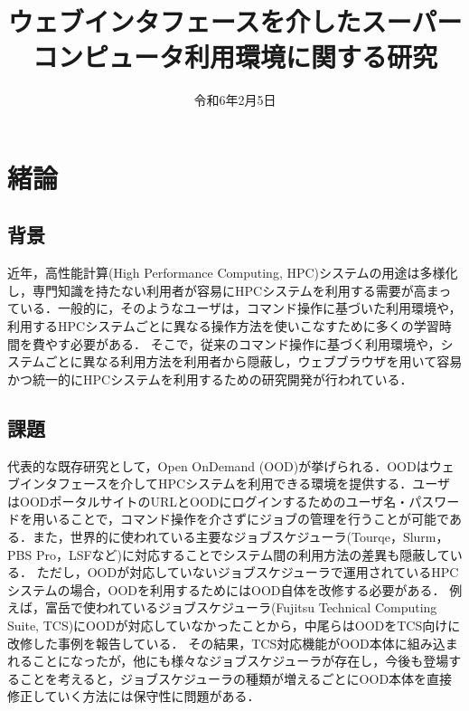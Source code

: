 \documentclass[a4paper,oneside,twocolumn,notitlepage,dvipdfmx]{jsarticle}
\date{令和6年2月5日}
\title{ウェブインタフェースを介したスーパーコンピュータ利用環境に関する研究}
\begin{document}
\maketitle
\section{緒論}
\subsection{背景}
近年，高性能計算(High Performance Computing, HPC)システムの用途は多様化し，専門知識を持たない利用者が容易にHPCシステムを利用する需要が高まっている．一般的に，そのようなユーザは，コマンド操作に基づいた利用環境や，利用するHPCシステムごとに異なる操作方法を使いこなすために多くの学習時間を費やす必要がある．
そこで，従来のコマンド操作に基づく利用環境や，システムごとに異なる利用方法を利用者から隠蔽し，ウェブブラウザを用いて容易かつ統一的にHPCシステムを利用するための研究開発が行われている．\par

\subsection{課題}
代表的な既存研究として，Open OnDemand (OOD)が挙げられる\cite{citation_2}．OODはウェブインタフェースを介してHPCシステムを利用できる環境を提供する．ユーザはOODポータルサイトのURLとOODにログインするためのユーザ名・パスワードを用いることで，コマンド操作を介さずにジョブの管理を行うことが可能である．また，世界的に使われている主要なジョブスケジューラ(Tourqe，Slurm，PBS Pro，LSFなど)に対応することでシステム間の利用方法の差異も隠蔽している．
ただし，OODが対応していないジョブスケジューラで運用されているHPCシステムの場合，OODを利用するためにはOOD自体を改修する必要がある．
例えば，富岳で使われているジョブスケジューラ(Fujitsu Technical Computing Suite, TCS)にOODが対応していなかったことから，中尾らはOODをTCS向けに改修した事例を報告している\cite{citation_1}．
その結果，TCS対応機能がOOD本体に組み込まれることになったが，他にも様々なジョブスケジューラが存在し，今後も登場することを考えると，ジョブスケジューラの種類が増えるごとにOOD本体を直接修正していく方法には保守性に問題がある．\par
\end{document}
